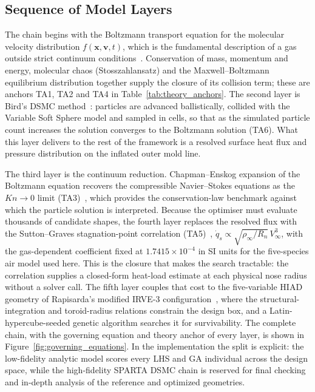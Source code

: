 \subsection{Sequence of Model Layers}

The chain begins with the Boltzmann transport equation for the molecular velocity distribution $f(\mathbf{x},\mathbf{v},t)$, which is the fundamental description of a gas outside strict continuum conditions~\cite{bird1994molecular}. Conservation of mass, momentum and energy, molecular chaos (Stosszahlansatz) and the Maxwell--Boltzmann equilibrium distribution together supply the closure of its collision term; these are anchors TA1, TA2 and TA4 in Table~\ref{tab:theory_anchors}. The second layer is Bird's DSMC method~\cite{bird1994molecular}: particles are advanced ballistically, collided with the Variable Soft Sphere model and sampled in cells, so that as the simulated particle count increases the solution converges to the Boltzmann solution (TA6). What this layer delivers to the rest of the framework is a resolved surface heat flux and pressure distribution on the inflated outer mold line.

The third layer is the continuum reduction. Chapman--Enskog expansion of the Boltzmann equation recovers the compressible Navier--Stokes equations as the $Kn \to 0$ limit (TA3)~\cite{chapman1970kinetic}, which provides the conservation-law benchmark against which the particle solution is interpreted. Because the optimiser must evaluate thousands of candidate shapes, the fourth layer replaces the resolved flux with the Sutton--Graves stagnation-point correlation (TA5)~\cite{sutton1971gravesh}, $\dot{q}_s \propto \sqrt{\rho_\infty/R_n}\,V_\infty^3$, with the gas-dependent coefficient fixed at $1.7415\times10^{-4}$ in SI units for the five-species air model used here. This is the closure that makes the search tractable: the correlation supplies a closed-form heat-load estimate at each physical nose radius without a solver call. The fifth layer couples that cost to the five-variable HIAD geometry of Rapisarda's modified IRVE-3 configuration~\cite{rapisarda2023mdao,dillman2015irve3}, where the structural-integration and toroid-radius relations constrain the design box, and a Latin-hypercube-seeded genetic algorithm searches it for survivability. The complete chain, with the governing equation and theory anchor of every layer, is shown in Figure~\ref{fig:governing_equations}. In the implementation the split is explicit: the low-fidelity analytic model scores every LHS and GA individual across the design space, while the high-fidelity SPARTA DSMC chain is reserved for final checking and in-depth analysis of the reference and optimized geometries.



